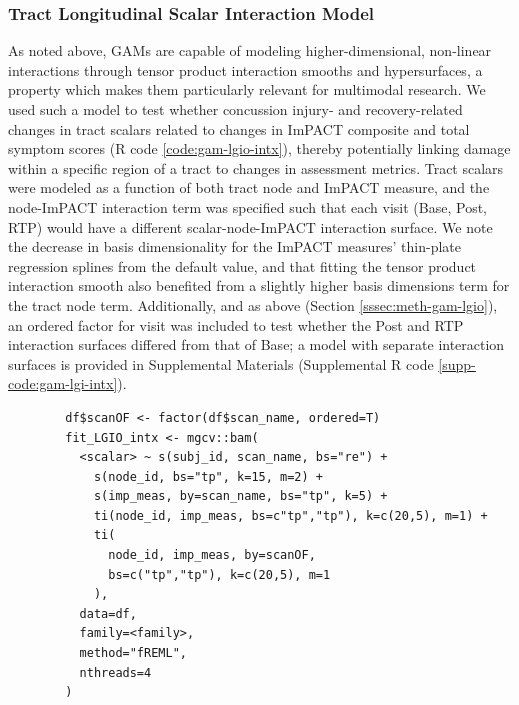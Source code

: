 \documentclass[]{imag-ms-template}
\begin{document}
\subsubsection{Tract Longitudinal Scalar Interaction Model}
\label{sssec:meth-gam-lgio-intx}
As noted above, GAMs are capable of modeling higher-dimensional, non-linear interactions through tensor product interaction smooths and hypersurfaces, a property which makes them particularly relevant for multimodal research. We used such a model to test whether concussion injury- and recovery-related changes in tract scalars related to changes in ImPACT composite and total symptom scores (R code \ref{code:gam-lgio-intx}), thereby potentially linking damage within a specific region of a tract to changes in assessment metrics. Tract scalars were modeled as a function of both tract node and ImPACT measure, and the node-ImPACT interaction term was specified such that each visit (Base, Post, RTP) would have a different scalar-node-ImPACT interaction surface. We note the decrease in basis dimensionality for the ImPACT measures' thin-plate regression splines from the default value, and that fitting the tensor product interaction smooth also benefited from a slightly higher basis dimensions term for the tract node term. Additionally, and as above (Section \ref{sssec:meth-gam-lgio}), an ordered factor for visit was included to test whether the Post and RTP interaction surfaces differed from that of Base; a model with separate interaction surfaces is provided in Supplemental Materials (Supplemental R code \ref{supp-code:gam-lgi-intx}).

\begin{equ}[H]
	\begin{lstlisting}
		df$scanOF <- factor(df$scan_name, ordered=T)
		fit_LGIO_intx <- mgcv::bam(
		  <scalar> ~ s(subj_id, scan_name, bs="re") +
		    s(node_id, bs="tp", k=15, m=2) +
		    s(imp_meas, by=scan_name, bs="tp", k=5) +
		    ti(node_id, imp_meas, bs=c"tp","tp"), k=c(20,5), m=1) +
		    ti(
		      node_id, imp_meas, by=scanOF,
		      bs=c("tp","tp"), k=c(20,5), m=1
		    ),
		  data=df,
		  family=<family>,
		  method="fREML",
		  nthreads=4
		)
	\end{lstlisting}
	\caption{Tract scalars are modeled as a function of separate 1D node and ImPACT smooths as well as a 2D tensor product interaction surface, with ordered factors used to compare Post and RTP surfaces to Base. \lstinline{imp_meas} = ImPACT composite or total symptom measure.}
	\label{code:gam-lgio-intx}
\end{equ}
\end{document}
